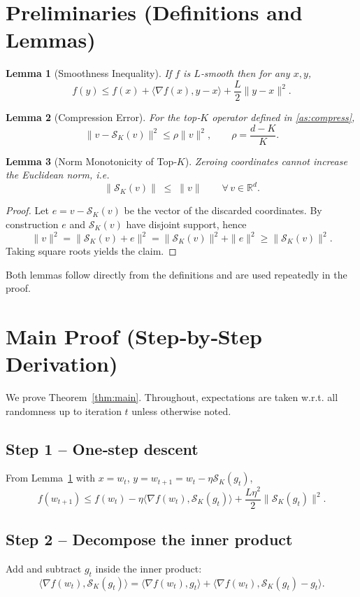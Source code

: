 \documentclass{article}
\newtheorem{lemma}{Lemma}
\newcommand{\topk}[1]{\mathcal{S}_K(#1)}
\begin{document}
\section*{Preliminaries (Definitions and Lemmas)}
\begin{lemma}[Smoothness Inequality]\label{lem:smooth}
If $f$ is $L$‑smooth then for any $x,y$,
\[
f(y)\le f(x)+\langle\nabla f(x),y-x\rangle+\frac{L}{2}\|y-x\|^2 .
\]
\end{lemma}
\begin{lemma}[Compression Error]\label{lem:compress}
For the top‑$K$ operator defined in \eqref{as:compress},
\[
\|v-\topk{v}\|^2\le\rho\|v\|^2,\qquad\rho=\frac{d-K}{K}.
\]
\end{lemma}
\begin{lemma}[Norm Monotonicity of Top‑$K$]\label{lem:normmono}
Zeroing coordinates cannot increase the Euclidean norm, i.e.
\[
\|\topk{v}\|\;\le\;\|v\|\qquad\forall\,v\in\mathbb{R}^d .
\]
\end{lemma}
\begin{proof}
Let $e=v-\topk{v}$ be the vector of the discarded coordinates.  By construction $e$ and $\topk{v}$ have disjoint support, hence
\[
\|v\|^2=\|\topk{v}+e\|^2=\|\topk{v}\|^2+\|e\|^2\ge\|\topk{v}\|^2 .
\]
Taking square roots yields the claim. \qedhere
\end{proof}

Both lemmas follow directly from the definitions and are used repeatedly in the proof.

\section*{Main Proof (Step‑by‑Step Derivation)}
We prove Theorem~\ref{thm:main}. Throughout, expectations are taken w.r.t. all randomness up to iteration $t$ unless otherwise noted.

\subsection*{Step 1 – One‑step descent}
From Lemma~\ref{lem:smooth} with $x=w_t$, $y=w_{t+1}=w_t-\eta\topk{g_t}$,
\[
f(w_{t+1})\le f(w_t)-\eta\langle\nabla f(w_t),\topk{g_t}\rangle
+\frac{L\eta^{2}}{2}\|\topk{g_t}\|^{2}. \tag{4}
\]

\subsection*{Step 2 – Decompose the inner product}
Add and subtract $g_t$ inside the inner product:
\[
\langle\nabla f(w_t),\topk{g_t}\rangle
=\langle\nabla f(w_t),g_t\rangle
+\langle\nabla f(w_t),\topk{g_t}-g_t\rangle . \tag{5}
\]
\end{document}

